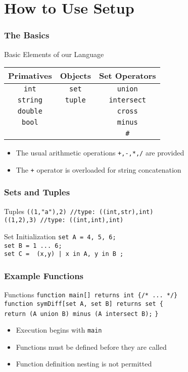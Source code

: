 \documentclass{beamer}
\begin{document}
\section*{How to Use Setup}
\begin{frame}
\frametitle{The Basics}

\begin{block}{Basic Elements of our Language}
\begin{center}
\begin{tabular}{ccc}
\textbf{Primatives} &\textbf{Objects} &\textbf{Set Operators}\\\hline
\texttt{int} &\texttt{set} &\texttt{union}\\
\texttt{string} &\texttt{tuple} &\texttt{intersect}\\
\texttt{double} & &\texttt{cross}\\
\texttt{bool} & &\texttt{minus}\\
 & &\texttt{\#}
\end{tabular}
\end{center}
\end{block}

\begin{itemize}
\item The usual arithmetic operations \texttt{+,-,*,/} are provided
\item The \texttt{+} operator is overloaded for string concatenation
\end{itemize}
\end{frame}

\begin{frame}
\frametitle{Sets and Tuples}
\begin{block}{Tuples}
\texttt{((1,"a"),2) //type: ((int,str),int)}\\
\texttt{((1,2),3) //type: ((int,int),int)}
\end{block}

\begin{block}{Set Initialization}
\texttt{set A = {4, 5, 6};}\\
\texttt{set B = {1 ... 6};}\\
\texttt{set C = { (x,y) | x in A, y in B };}
\end{block}

\end{frame}

\begin{frame}
\frametitle{Example Functions}
\begin{block}{Functions}
\texttt{function main[] returns int \{/* ... */\}}\\
\texttt{function symDiff[set A, set B] returns set \{}\\
\texttt{\qquad\qquad return (A union B) minus (A intersect B);}
\texttt{\}}

\end{block}
\begin{itemize}
\item Execution begins with \texttt{main}
\item Functions must be defined before they are called
\item Function definition nesting is not permitted
\end{itemize}
\end{frame}
\end{document}
